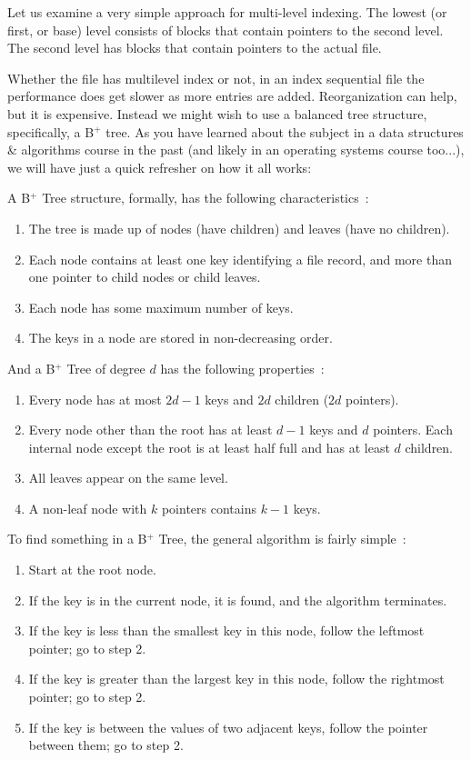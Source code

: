 Let us examine a very simple approach for multi-level indexing. The lowest (or first, or base) level consists of blocks that contain pointers to the second level. The second level has blocks that contain pointers to the actual file. 

Whether the file has multilevel index or not, in an index sequential file the performance does get slower as more entries are added. Reorganization can help, but it is expensive. Instead we might wish to use a balanced tree structure, specifically, a B$^{+}$ tree. As you have learned about the subject in a data structures \& algorithms course in the past (and likely in an operating systems course too...), we will have just a quick refresher on how it all works:

A B$^{+}$ Tree structure, formally, has the following characteristics~\cite{osi}:

\begin{enumerate}
	\item The tree is made up of nodes (have children) and leaves (have no children).
	\item Each node contains at least one key identifying a file record, and more than one pointer to child nodes or child leaves.
	\item Each node has some maximum number of keys.
	\item The keys in a node are stored in non-decreasing order.
\end{enumerate}

And a B$^{+}$ Tree of degree $d$ has the following properties~\cite{osi}:

\begin{enumerate}
	\item Every node has at most $2d-1$ keys and $2d$ children ($2d$ pointers).
	\item Every node other than the root has at least $d-1$ keys and $d$ pointers. Each internal node except the root is at least half full and has at least $d$ children.
	\item All leaves appear on the same level.
	\item A non-leaf node with $k$ pointers contains $k-1$ keys.
\end{enumerate}

To find something in a B$^{+}$ Tree, the general algorithm is fairly simple~\cite{osi}:

\begin{enumerate}
	\item Start at the root node. 
	\item If the key is in the current node, it is found, and the algorithm terminates.
	\item If the key is less than the smallest key in this node, follow the leftmost pointer; go to step 2.
	\item If the key is greater than the largest key in this node, follow the rightmost pointer; go to step 2.
	\item If the key is between the values of two adjacent keys, follow the pointer between them; go to step 2.
\end{enumerate}



